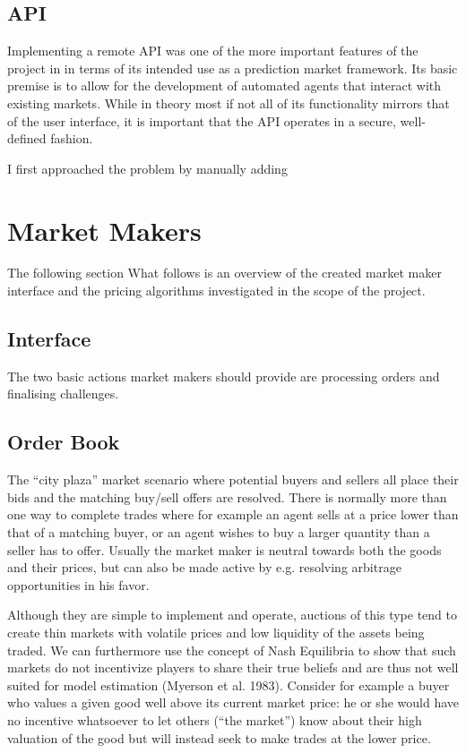 \documentclass[bsc,frontabs,twoside,singlespacing,parskip,deptreport]{infthesis}     %
\begin{document}
\subsection{API}
    
	Implementing a remote API was one of the more important features of the project in in terms of its intended use as a prediction market framework. Its basic premise is to allow for the development of automated agents that interact with existing markets. While in theory most if not all of its functionality mirrors that of the user interface, it is important that the API operates in a secure, well-defined fashion. 
    
    I first approached the problem by manually adding 
    
\section{Market Makers}
    The following section 
	What follows is an overview of the created market maker interface and the pricing algorithms investigated in the scope of the project. 

\subsection{Interface}
	The two basic actions market makers should provide are processing orders and finalising challenges. 
	
\subsection{Order Book}
	
	The “city plaza” market scenario where potential buyers and sellers all place their bids and the matching buy/sell offers are resolved. There is normally more than one way to complete trades where for example an agent sells at a price lower than that of a matching buyer, or an agent wishes to buy a larger quantity than a seller has to offer. Usually the market maker is neutral towards both the goods and their prices, but can also be made active by e.g. resolving arbitrage opportunities in his favor.

	Although they are simple to implement and operate, auctions of this type tend to create thin markets with volatile prices and low liquidity of the assets being traded. We can furthermore use the concept of Nash Equilibria to show that such markets do not incentivize players to share their true beliefs and are thus not well suited for model estimation (Myerson et al. 1983). Consider for example a buyer who values a given good well above its current market price: he or she would have no incentive whatsoever to let others (“the market”) know about their high valuation of the good but will instead seek to make trades at the lower price.
	
\end{document}
